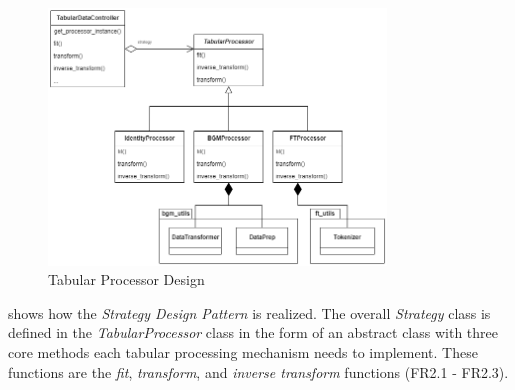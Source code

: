 \begin{figure}[h]
	\centering
	\includegraphics[width=0.8\textwidth]{images/tabular_processor.png}
	\caption[Tabular Processor Design]{Tabular Processor Design}
	\label{fig:tabular_processor}
\end{figure}

 shows how the \textit{Strategy Design Pattern} is realized.
The overall \textit{Strategy} class is defined in the \textit{TabularProcessor} class in the form of an abstract class with three core methods each tabular processing mechanism needs to implement.
These functions are the \textit{fit}, \textit{transform}, and \textit{inverse transform} functions (FR2.1 - FR2.3).

